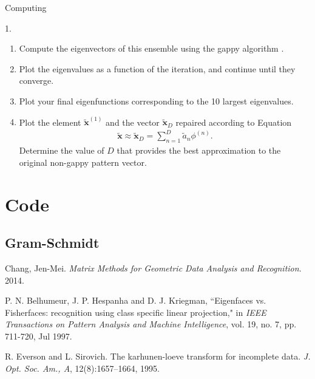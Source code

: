\begin{section}{Computing}
\begin{homeworkSection}{1. }
\renewcommand{\theenumi}{\alph{enumi}}
\begin{enumerate}
  \item Compute the eigenvectors of this ensemble using the gappy algorithm \cite{everson}.
  \item Plot the eigenvalues as a function of the iteration, and continue until they converge.
  \item Plot your final eigenfunctions corresponding to the 10 largest eigenvalues.
  \item Plot the element $\tilde{\bm{x}}^{(1)}$ and the vector $\tilde{\bm{x}}_D$ repaired 	according to Equation
  \begin{align}
  	\tilde{\bm{x}} \approx \tilde{\bm{x}}_D = \sum_{n=1}^D \tilde{a}_n \phi^{(n)}.
  \end{align}
  Determine the value of $D$ that provides the best approximation to the original non-gappy pattern vector.
\end{enumerate}

\end{homeworkSection}
	
\end{section}
\newpage

\appendix

\section{Code}\label{code}

\subsection{Gram-Schmidt} \label{code:gram_schmidt}

% 


\begin{thebibliography}{10}
    Chang, Jen-Mei. \textit{Matrix Methods for Geometric Data Analysis and Recognition}. 2014.

    P. N. Belhumeur, J. P. Hespanha and D. J. Kriegman, ``Eigenfaces vs. Fisherfaces: recognition using class specific linear projection," in \textit{IEEE Transactions on Pattern Analysis and Machine Intelligence}, vol. 19, no. 7, pp. 711-720, Jul 1997.

    R. Everson and L. Sirovich. The karhunen-loeve transform for incomplete data. \textit{J. Opt. Soc. Am., A}, 12(8):1657–1664, 1995.
\end{thebibliography}


